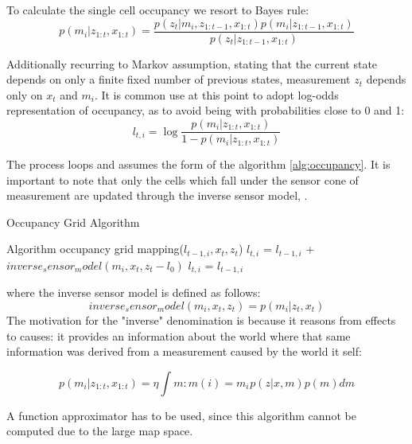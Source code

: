 To calculate the single cell occupancy we resort to Bayes rule:
\begin{equation}
    p(m_{i} | z_{1:t},x_{1:t}) = \frac{p(z_{t} | m_{i},z_{1:t-1},x_{1:t}) p(m_{i} | z_{1:t-1},x_{1:t})}{p(z_{t} |z_{1:t-1},x_{1:t})}
\end{equation}

Additionally recurring to Markov assumption, stating that the current state depends on only a finite fixed number of previous states, measurement $z_{t}$ depends only on $x_{t}$ and $m_{i}$.
It is common use at this point to adopt log-odds representation of occupancy, as to avoid being with probabilities close to 0 and 1:
\begin{equation}
    l_{t,i} = \log{\frac{p(m_{i} | z_{1:t},x_{1:t})}{1 - p(m_{i} | z_{1:t},x_{1:t})}}
\end{equation}

The process loops and assumes the form of the algorithm \ref{alg:occupancy}.
It is important to note that only the cells which fall under the sensor cone of measurement are updated through the inverse sensor model, \citet{thrun2005probabilistic}.
\begin{algorithm}
\caption{Occupancy Grid Algorithm}\label{alg:occupancy}
\begin{algorithmic}
\STATE Algorithm occupancy grid mapping({$l_{t-1,i},x_{t},z_{t}$})
        \STATE $l_{t,i}$ = $l_{t-1,i}$ + $inverse_sensor_model(m_{i},x_{t},z_{t} - l_{0})$
    \ELSE
        \STATE $l_{t,i}$ = $l_{t-1,i}$
    \ENDIF
\ENDFOR
{}
\end{algorithmic}
\end{algorithm}

where the inverse sensor model is defined as follows:
\begin{equation}
    inverse_sensor_model(m_{i},x_{t},z_{t}) = p(m_{i}|z_{t}, x_{t})
\end{equation}
The motivation for the "inverse" denomination is because it reasons from effects to causes: it provides an information about the world where that same information was derived from a measurement caused by the world it self:

\begin{equation}
    p(m_{i} | z_{1:t},x_{1:t}) = \eta \int{m:m(i)=m_{i}}^{} p(z | x,m) p(m) dm
\end{equation}

A function approximator has to be used, since this algorithm cannot be computed due to the large map space.

